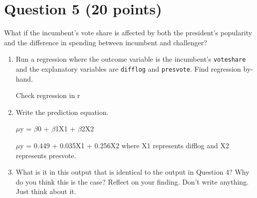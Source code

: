 \documentclass[12pt,letterpaper]{article}
\begin{document}
\section*{Question 5 (20 points)}
\noindent What if the incumbent's vote share is affected by both the president's popularity and the difference in spending between incumbent and challenger? 
	\begin{enumerate}
		\item Run a regression where the outcome variable is the incumbent's \texttt{voteshare} and the explanatory variables are \texttt{difflog} and \texttt{presvote}.
		Find regression by-hand.
		 
		
		Check regression in r
		 
		
		\item Write the prediction equation.
		
		\vspace{.1cm}
		
		$\mu$y = $\beta$0 + $\beta$1X1 + $\beta$2X2
		
		\vspace{.1cm}
		
		$\mu$y = 0.449 + 0.035X1 + 0.256X2 where X1 represents difflog and X2 represents presvote.
		
		\item What is it in this output that is identical to the output in Question 4? Why do you think this is the case?
		Reflect on your finding. Don't write anything. Just think about it.
	\end{enumerate}
\end{document}
